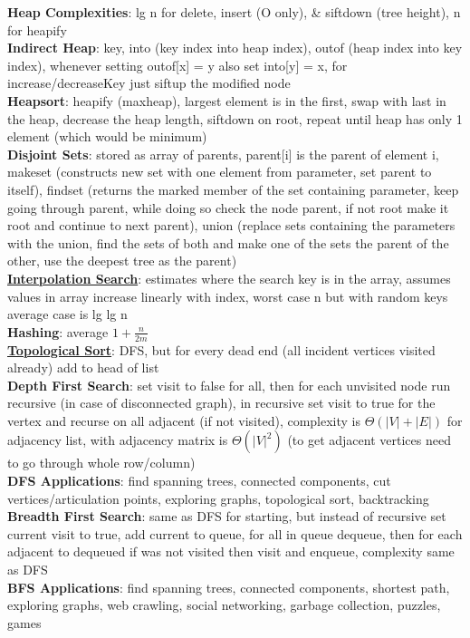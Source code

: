 \documentclass[a4paper]{article}
\begin{document}
\begin{multicols}{2}
        \textbf{Heap Complexities}: lg n for delete, insert (O only), \& siftdown (tree height), n for heapify\\
        \textbf{Indirect Heap}: key, into (key index into heap index), outof (heap index into key index), whenever setting outof[x] = y also set into[y] = x, for increase/decreaseKey just siftup the modified node\\
        \textbf{Heapsort}: heapify (maxheap), largest element is in the first, swap with last in the heap, decrease the heap length, siftdown on root, repeat until heap has only 1 element (which would be minimum)\\
        \textbf{Disjoint Sets}: stored as array of parents, parent[i] is the parent of element i, makeset (constructs new set with one element from parameter, set parent to itself), findset (returns the marked member of the set containing parameter, keep going through parent, while doing so check the node parent, if not root make it root and continue to next parent), union (replace sets containing the parameters with the union, find the sets of both and make one of the sets the parent of the other, use the deepest tree as the parent)\\
        \underline{\textbf{Interpolation Search}}: estimates where the search key is in the array, assumes values in array increase linearly with index, worst case n but with random keys average case is lg lg n\\
        \textbf{Hashing}: average $1 + \frac{n}{2m}$\\
        \underline{\textbf{Topological Sort}}: DFS, but for every dead end (all incident vertices visited already) add to head of list\\
        \textbf{Depth First Search}: set visit to false for all, then for each unvisited node run recursive (in case of disconnected graph), in recursive set visit to true for the vertex and recurse on all adjacent (if not visited), complexity is $\Theta (|V| + |E|)$ for adjacency list, with adjacency matrix is $\Theta (|V|^2)$ (to get adjacent vertices need to go through whole row/column)\\
        \textbf{DFS Applications}: find spanning trees, connected components, cut vertices/articulation points, exploring graphs, topological sort, backtracking\\
        \textbf{Breadth First Search}: same as DFS for starting, but instead of recursive set current visit to true, add current to queue, for all in queue dequeue, then for each adjacent to dequeued if was not visited then visit and enqueue, complexity same as DFS\\
        \textbf{BFS Applications}: find spanning trees, connected components, shortest path, exploring graphs, web crawling, social networking, garbage collection, puzzles, games\\
    \end{multicols}
    
\end{document}
